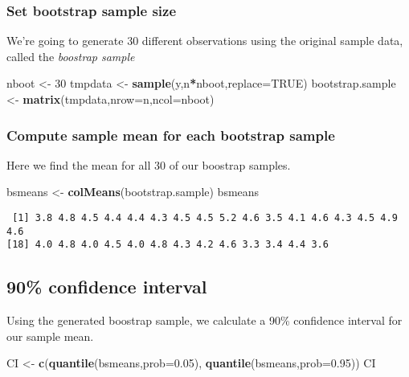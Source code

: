 \documentclass[]{book}
\newenvironment{Shaded}{\begin{snugshade}}{\end{snugshade}}
\newcommand{\KeywordTok}[1]{\textcolor[rgb]{0.13,0.29,0.53}{\textbf{#1}}}
\newcommand{\DataTypeTok}[1]{\textcolor[rgb]{0.13,0.29,0.53}{#1}}
\newcommand{\DecValTok}[1]{\textcolor[rgb]{0.00,0.00,0.81}{#1}}
\newcommand{\FloatTok}[1]{\textcolor[rgb]{0.00,0.00,0.81}{#1}}
\newcommand{\StringTok}[1]{\textcolor[rgb]{0.31,0.60,0.02}{#1}}
\newcommand{\OtherTok}[1]{\textcolor[rgb]{0.56,0.35,0.01}{#1}}
\newcommand{\OperatorTok}[1]{\textcolor[rgb]{0.81,0.36,0.00}{\textbf{#1}}}
\newcommand{\NormalTok}[1]{#1}
\theoremstyle{definition}
\theoremstyle{definition}
\theoremstyle{definition}
\theoremstyle{remark}
\begin{document}
\subsubsection{Set bootstrap sample
size}\label{set-bootstrap-sample-size}

We're going to generate 30 different observations using the original
sample data, called the \emph{boostrap sample}

\begin{Shaded}
\begin{Highlighting}[]
\NormalTok{nboot <-}\StringTok{ }\DecValTok{30}
\NormalTok{tmpdata <-}\StringTok{ }\KeywordTok{sample}\NormalTok{(y,n}\OperatorTok{*}\NormalTok{nboot,}\DataTypeTok{replace=}\OtherTok{TRUE}\NormalTok{)}
\NormalTok{bootstrap.sample <-}\StringTok{ }\KeywordTok{matrix}\NormalTok{(tmpdata,}\DataTypeTok{nrow=}\NormalTok{n,}\DataTypeTok{ncol=}\NormalTok{nboot)}
\end{Highlighting}
\end{Shaded}

\subsubsection{Compute sample mean for each bootstrap
sample}\label{compute-sample-mean-for-each-bootstrap-sample}

Here we find the mean for all 30 of our boostrap samples.

\begin{Shaded}
\begin{Highlighting}[]
\NormalTok{bsmeans <-}\StringTok{ }\KeywordTok{colMeans}\NormalTok{(bootstrap.sample)}
\NormalTok{bsmeans}
\end{Highlighting}
\end{Shaded}

\begin{verbatim}
 [1] 3.8 4.8 4.5 4.4 4.4 4.3 4.5 4.5 5.2 4.6 3.5 4.1 4.6 4.3 4.5 4.9 4.6
[18] 4.0 4.8 4.0 4.5 4.0 4.8 4.3 4.2 4.6 3.3 3.4 4.4 3.6
\end{verbatim}

\subsection{90\% confidence interval}\label{confidence-interval}

Using the generated boostrap sample, we calculate a 90\% confidence
interval for our sample mean.

\begin{Shaded}
\begin{Highlighting}[]
\NormalTok{CI <-}\StringTok{ }\KeywordTok{c}\NormalTok{(}\KeywordTok{quantile}\NormalTok{(bsmeans,}\DataTypeTok{prob=}\FloatTok{0.05}\NormalTok{), }\KeywordTok{quantile}\NormalTok{(bsmeans,}\DataTypeTok{prob=}\FloatTok{0.95}\NormalTok{))}
\NormalTok{CI}
\end{Highlighting}
\end{Shaded}
\end{document}
